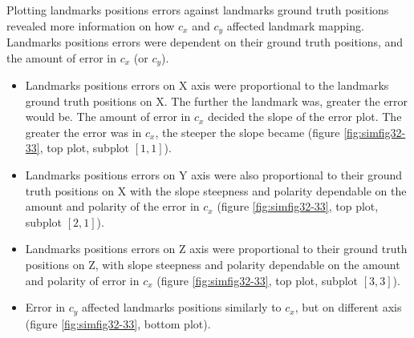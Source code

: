 Plotting landmarks positions errors against landmarks ground truth
positions revealed more information on how $c_{x}$ and $c_{y}$
affected landmark mapping. Landmarks positions errors were dependent
on their ground truth positions, and the amount of error in $c_{x}$
(or $c_{y}$).

\begin{itemize}
  \item Landmarks positions errors on X axis were proportional to the
  landmarks ground truth positions on X. The further the landmark was,
  greater the error would be. The amount of error in $c_{x}$
  decided the slope of the error plot. The greater the error was in
  $c_{x}$, the steeper the slope became (figure \ref{fig:simfig32-33},
  top plot, subplot $[1,1]$).
  \item Landmarks positions errors on Y axis were also proportional to
  their ground truth positions on X with the slope steepness and
  polarity dependable on the amount and polarity of the error in
  $c_{x}$ (figure \ref{fig:simfig32-33}, top plot, subplot $[2,1]$).
  \item Landmarks positions errors on Z axis were proportional to
  their ground truth positions on Z, with slope steepness and polarity
  dependable on the amount and polarity of error in $c_{x}$ (figure
  \ref{fig:simfig32-33}, top plot, subplot $[3,3]$).
  \item Error in $c_{y}$ affected landmarks positions similarly to
  $c_{x}$, but on different axis (figure \ref{fig:simfig32-33}, bottom
  plot).
\end{itemize}

